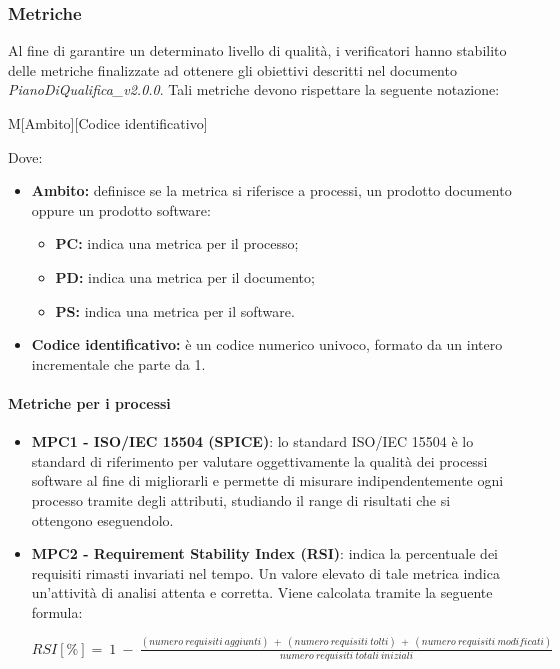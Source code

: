 \documentclass[11pt,a4paper]{article}
\begin{document}
{	\subsubsection{Metriche}
	Al fine di garantire un determinato livello di qualità, i verificatori hanno stabilito delle metriche finalizzate ad ottenere gli obiettivi descritti  nel documento \textit{PianoDiQualifica\_v2.0.0}. Tali metriche devono rispettare la seguente notazione: 
	\begin{center}
		M[Ambito][Codice identificativo]
	\end{center}
	Dove:
	\begin{itemize}
		\item \textbf{Ambito:} definisce se la metrica si riferisce a processi, un prodotto documento oppure un prodotto software:
		\begin{itemize}
			\item \textbf{PC:} indica una metrica per il processo;
			\item \textbf{PD:} indica una metrica per il documento;
			\item \textbf{PS:} indica una metrica per il software.
		\end{itemize}
		\item \textbf{Codice identificativo:} è un codice numerico univoco, formato da un intero incrementale che parte da 1.
	\end{itemize}
	
	\paragraph{Metriche per i processi}
	\begin{itemize}
	 \item \textbf{MPC1 - ISO/IEC 15504 (SPICE)}: lo standard ISO/IEC 15504 è lo standard di riferimento per valutare oggettivamente la qualità dei processi software al fine di migliorarli e permette di misurare indipendentemente ogni processo tramite degli attributi, studiando il range di risultati che si ottengono eseguendolo. 
	 
	 
	 \item \textbf{MPC2 - Requirement Stability Index (RSI)}: indica la percentuale dei requisiti rimasti invariati nel tempo. Un valore elevato di tale metrica indica un’attività di analisi attenta e corretta. Viene calcolata tramite la seguente formula:
	 \begin{center}
		$RSI[\%] =\ 1\ -\ \frac{(numero\ requisiti\ aggiunti)\ +\ (numero\ requisiti\ tolti)\ +\ (numero\ requisiti\ modificati)}{numero\ requisiti\ totali\ iniziali}$
	\end{center}
	

\end{itemize}}
\end{document}
